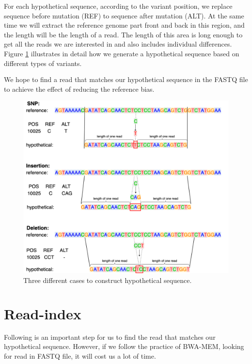 For each hypothetical sequence, according to the variant position, we replace sequence before mutation (REF) to sequence after mutation (ALT). At the same time we will extract the reference genome part front and back in this region, and the length will be the length of a read. The length of this area is long enough to get all the reads we are interested in and also includes individual differences. Figure  \ref{f3-4} illustrates in detail how we generate a hypothetical sequence based on different types of variants.

We hope to find a read that matches our hypothetical sequence in the FASTQ file to achieve the effect of reducing the reference bias.
\vspace{1cm}
\begin{figure}[H]
    \centering
    \includegraphics[width=1\columnwidth]{body/image/3-4.png}
    \captionsetup{labelfont=bf}
    \renewcommand{\baselinestretch}{1.0}
    \vspace{-0.5cm}
    \caption[construct hypothetical sequence]{Three different cases to construct hypothetical sequence.}
    \label{f3-4}
\end{figure}

\section{Read-index}

Following is an important step for us to find the read that matches our hypothetical sequence. However, if we follow the practice of BWA-MEM, looking for read in FASTQ file, it will cost us a lot of time. 


